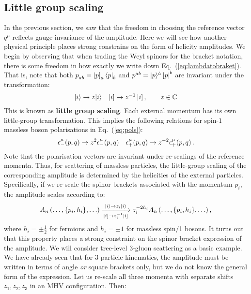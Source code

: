 \documentclass[main.tex]{subfiles}
\begin{document}
\subsection{Little group scaling} \label{sec:littlegroup}
In the previous section, we saw that the freedom in choosing the reference vector $q^\mu$ reflects gauge invariance of the amplitude. Here we will see how another physical principle places strong constrains on the form of helicity amplitudes. We begin by observing that when trading the Weyl spinors for the bracket notation, there is some freedom in how exactly we write down Eq.~(\ref{eq:lambdatobraket}). That is, note that both $p_{a\dot{b}} = \left| p \right]_a \langle p|_{\dot{b}}$ and $p^{\dot{a}b} = |p \rangle^{\dot{a}} \left[ p \right|^b$ are invariant under the transformation:
\begin{align} \label{eq:littlegroupscaling}
    |i \rangle \rightarrow z |i \rangle && \left| i \right] \rightarrow z^{-1} \left| i \right], \qquad z \in \mathbb{C}  
\end{align}
This is known as \textbf{little group scaling}. Each external momentum has its own little-group transformation. This implies the following relations for spin-$1$ massless boson polarisations in Eq.~(\ref{eq:pols}):
\begin{align}
    \epsilon^\mu_- (p,q) \rightarrow z^2 \epsilon^\mu_- (p,q) &&  \epsilon^\mu_+ (p,q) \rightarrow z^{-2} \epsilon^\mu_+ (p,q) \,.
\end{align}
Note that the polarisation vectors are invariant under re-scalings of the reference momenta. Thus, for scattering of massless particles, the little-group scaling of the corresponding amplitude is determined by the helicities of the external particles. Specifically, if we re-scale the spinor brackets associated with the momentum $p_i$, the amplitude scales according to:
\begin{equation}
    A_n \left(\ldots, \{p_i, h_i\}, \ldots \right) \xrightarrow[\ketsq{i} \rightarrow z_i^{-1}\ketsq{i}]{\ket{i} \rightarrow z_i\ket{i}} z_i^{-2h_i}  A_n \left(\ldots, \{p_i, h_i\}, \ldots \right),
\end{equation}
where $h_i=\pm\frac{1}{2}$ for fermions and $h_i=\pm1$ for massless spin\=/1 bosons. It turns out that this property places a strong constraint on the spinor bracket expression of the amplitude. We will consider tree-level 3-gluon scattering as a basic example. We have already seen that for 3-particle kinematics, the amplitude must be written in terms of angle \textit{or} square brackets only, but we do not know the general form of the expression. Let us re-scale all three momenta with separate shifts $z_1, z_2, z_3$ in an MHV configuration. Then:
\end{document}
